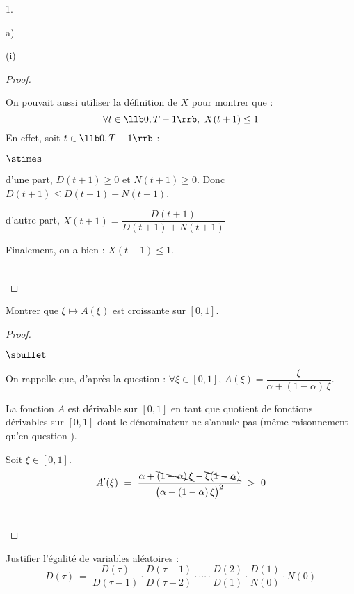 \begin{noliste}{1.}
\begin{noliste}{a)}
\begin{nonoliste}{(i)}
\begin{proof}
        \begin{remark}
          On pouvait aussi utiliser la définition de $X$ pour montrer
          que : 
	  \[
	    \forall t \in \llb 0, T-1\rrb, \ X(t+1) \leq 1
          \]
          En effet, soit $t \in \llb 0, T-1\rrb$ :
          \begin{noliste}{$\stimes$}
            \item d'une part, $D(t+1) \geq 0$ et $N(t+1) \geq 0$. Donc 
            $D(t+1) \leq D(t+1) + N(t+1)$.
            \item d'autre part, $X(t+1) = \dfrac{D(t+1)}{D(t+1) + 
	    N(t+1)}$~\\
          \end{noliste}
          Finalement, on a bien : $X(t+1) \leq 1$.
        \end{remark}~\\[-1.4cm]
      \end{proof}

      
      \item Montrer que $\xi \mapsto A(\xi)$ est croissante sur $[0,1]$.
      
      \begin{proof}~
        \begin{noliste}{$\sbullet$}
	  \item On rappelle que, d'après la question  :
	  $\forall \xi \in [0,1]$, $A(\xi) = \dfrac{\xi}{\alpha +
	  (1-\alpha) \, \xi}$.
	  
	  \item La fonction $A$ est dérivable sur $[0,1]$ en tant que 
	  quotient de fonctions dérivables sur $[0,1]$ dont le 
	  dénominateur ne s'annule pas (même raisonnement qu'en question 
	  ).
	  
	  \item Soit $\xi \in [0,1]$.
	  \[
	    A'(\xi) \ = \ \dfrac{\alpha + \bcancel{(1-\alpha) \, \xi}
	    - \bcancel{\xi(1-\alpha)}}{\big(\alpha + (1-\alpha) \,
	    \xi \big)^2} \ > \ 0
	  \]
	  ~\\[-1.4cm]
        \end{noliste}
      \end{proof}
    \end{nonoliste}
  \end{noliste}
    
  \item Justifier l'égalité de variables aléatoires :
  \[
    D(\tau) \ = \ \dfrac{D(\tau)}{D(\tau-1)} \cdot \dfrac{D(\tau-1)}
    {D(\tau-2)} \cdot \cdots \cdot \dfrac{D(2)}{D(1)} \cdot 
    \dfrac{D(1)}{N(0)} \cdot N(0)
  \]
  

\end{noliste}
